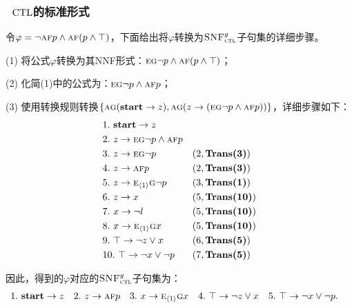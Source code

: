 \documentclass[9pt, CJK]{beamer}
\begin{document}
\begin{frame}
	\frametitle{~$\textrm{CTL}$的标准形式}
	\begin{example}\label{exmp:transbot}
		\tiny
		令$\varphi=\neg \textsc{a} \textsc{f} p \wedge \textsc{a}\textsc{f}(p \wedge \top)$，下面给出将$\varphi$转换为${\textsc{SNF}_{\textsc{ctl}}^g}$子句集的详细步骤。
		
		(1) 将公式$\varphi$转换为其NNF形式：$\textsc{e}\textsc{g} \neg p \wedge \textsc{a}\textsc{f}(p \wedge \top)$；
		
		(2) 化简(1)中的公式为：$\textsc{e}\textsc{g} \neg p \wedge \textsc{a}\textsc{f} p$；
		
		(3) 使用转换规则转换$\{\textsc{a}\textsc{g}(\textbf{start} \rightarrow z), \textsc{a}\textsc{g}(z \rightarrow (\textsc{e}\textsc{g} \neg p \wedge \textsc{a}\textsc{f} p))\}$，详细步骤如下：
		\begin{align*}
			&1.\ \textbf{start} \rightarrow z && \\
			&2.\ z \rightarrow \textsc{e}\textsc{g} \neg p \wedge \textsc{a}\textsc{f} p &&  \\
			&3.\ z \rightarrow  \textsc{e}\textsc{g} \neg p && (2, \textbf{Trans(3)})\\
			&4.\ z \rightarrow \textsc{a}\textsc{f} p && (2, \textbf{Trans(3)})\\
			&5.\ z \rightarrow  \textsc{e}_{{\langle{1}\rangle}}\textsc{g} \neg p  && (3, \textbf{Trans(1)})\\
			&6.\ z \rightarrow x && (5, \textbf{Trans(10)})\\
			&7.\ x\rightarrow \neg l && (5, \textbf{Trans(10)})\\
			&8.\ x\rightarrow \textsc{e}_{{\langle{1}\rangle}} \textsc{g} x&& (5, \textbf{Trans(10)})\\
			&9.\ \top \rightarrow \neg z \vee x && (6, \textbf{Trans(5)}) \\
			&10.\ \top \rightarrow \neg x \vee \neg p && (7, \textbf{Trans(5)}) 
		\end{align*}
		
		因此，得到的$\varphi$对应的${\textsc{SNF}_{\textsc{ctl}}^g}$子句集为：
		\begin{align*}
			&1.\ \textbf{start} \rightarrow z && 2.\ z \rightarrow \textsc{a}\textsc{f} p && 3.\ x\rightarrow \textsc{e}_{{\langle{1}\rangle}} \textsc{g} x
			&& 4.\ \top \rightarrow \neg z \vee x && 5.\ \top \rightarrow \neg x \vee \neg p.
		\end{align*}
	\end{example}
\end{frame}
\end{document}
